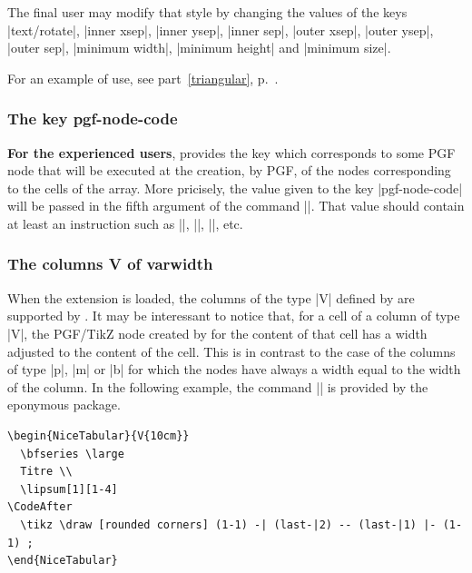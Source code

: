 \documentclass[dvipsnames]{article}
\begin{document}
The final user may modify that style by changing the values of the keys |text/rotate|,
|inner xsep|, |inner ysep|, |inner sep|, |outer xsep|, |outer ysep|, |outer sep|,
|minimum width|, |minimum height| and |minimum size|.

\medskip
For an example of use, see part~\ref{triangular}, p.~\pageref{triangular}.


\subsubsection{The key pgf-node-code}


\textbf{For the experienced users},  provides the key
 which corresponds to some PGF node that will be
executed at the creation, by PGF, of the nodes corresponding to the cells of the
array. More pricisely, the value given to the key |pgf-node-code| will be passed
in the fifth argument of the command |\pgfnode|. That value should contain at
least an instruction such as |\pgfusepath|, |\pgfusepathqstroke|, |\pgfusepathqfill|,
etc.

\subsubsection{The columns V of varwidth}

\label{node-V}

When the extension  is loaded, the columns of the type |V|
defined by  are supported by . It may be
interessant to notice that, for a cell of a column of type |V|, the PGF/TikZ
node created by  for the content of that cell has a width
adjusted to the content of the cell. This is in contrast to the case of the
columns of type |p|, |m| or |b| for which the nodes have always a width equal
to the width of the column. In the following example, the command |\lipsum| is
provided by the eponymous package.

\begin{Verbatim}
\begin{NiceTabular}{V{10cm}}
  \bfseries \large 
  Titre \\
  \lipsum[1][1-4] 
\CodeAfter 
  \tikz \draw [rounded corners] (1-1) -| (last-|2) -- (last-|1) |- (1-1) ; 
\end{NiceTabular}
\end{Verbatim}
\end{document}
